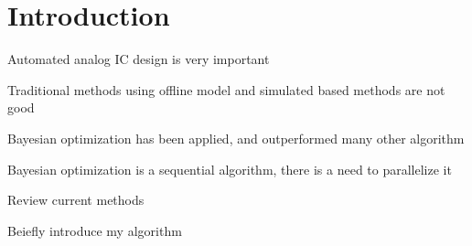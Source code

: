 \section{Introduction}

Automated analog IC design is very important

Traditional methods using offline model and simulated based methods are not good

Bayesian optimization has been applied, and outperformed many other algorithm

Bayesian optimization is a sequential algorithm, there is a need to parallelize it

Review current methods

Beiefly introduce my algorithm
